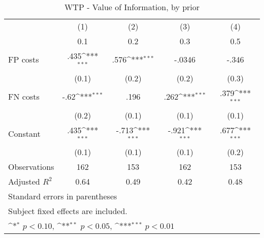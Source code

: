 \begin{table}[htbp]\centering
\def\sym#1{\ifmmode^{#1}\else\(^{#1}\)\fi}
\caption{WTP - Value of Information, by prior}
\begin{tabular}{l*{4}{c}}
\hline\hline
                &\multicolumn{1}{c}{(1)}&\multicolumn{1}{c}{(2)}&\multicolumn{1}{c}{(3)}&\multicolumn{1}{c}{(4)}\\
                &\multicolumn{1}{c}{0.1}&\multicolumn{1}{c}{0.2}&\multicolumn{1}{c}{0.3}&\multicolumn{1}{c}{0.5}\\
\hline
FP costs        &     .435\sym{***}&     .576\sym{***}&   -.0346         &    -.346         \\
                &    (0.1)         &    (0.2)         &    (0.2)         &    (0.3)         \\
FN costs        &     -.62\sym{***}&     .196         &     .262\sym{***}&     .379\sym{***}\\
                &    (0.2)         &    (0.1)         &    (0.1)         &    (0.1)         \\
Constant        &     .435\sym{***}&    -.713\sym{***}&    -.921\sym{***}&     .677\sym{***}\\
                &    (0.1)         &    (0.1)         &    (0.1)         &    (0.2)         \\
\hline
Observations    &      162         &      153         &      162         &      153         \\
Adjusted \(R^{2}\)&     0.64         &     0.49         &     0.42         &     0.48         \\
\hline\hline
\multicolumn{5}{l}{\footnotesize Standard errors in parentheses}\\
\multicolumn{5}{l}{\footnotesize Subject fixed effects are included.}\\
\multicolumn{5}{l}{\footnotesize \sym{*} \(p<0.10\), \sym{**} \(p<0.05\), \sym{***} \(p<0.01\)}\\
\end{tabular}
\end{table}

